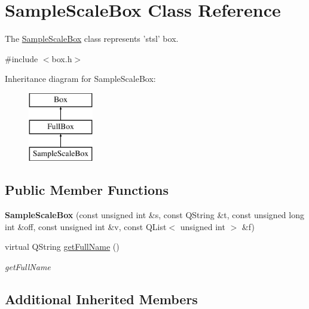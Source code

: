 \hypertarget{class_sample_scale_box}{\section{Sample\-Scale\-Box Class Reference}
\label{class_sample_scale_box}
}


The \hyperlink{class_sample_scale_box}{Sample\-Scale\-Box} class represents 'stsl' box.  




{\ttfamily \#include $<$box.\-h$>$}

Inheritance diagram for Sample\-Scale\-Box\-:\begin{figure}[H]
\begin{center}
\leavevmode
\includegraphics[height=3.000000cm]{class_sample_scale_box}
\end{center}
\end{figure}
\subsection*{Public Member Functions}
\begin{DoxyCompactItemize}
\item 
\hypertarget{class_sample_scale_box_af06508a5b6f42201950333b25fbd03cf}{{\bfseries Sample\-Scale\-Box} (const unsigned int \&s, const Q\-String \&t, const unsigned long int \&off, const unsigned int \&v, const Q\-List$<$ unsigned int $>$ \&f)}\label{class_sample_scale_box_af06508a5b6f42201950333b25fbd03cf}

\item 
virtual Q\-String \hyperlink{class_sample_scale_box_a10a781e0e86c780b2852359f5088bd9d}{get\-Full\-Name} ()
\begin{DoxyCompactList}\small\item\em get\-Full\-Name \end{DoxyCompactList}\end{DoxyCompactItemize}
\subsection*{Additional Inherited Members}


